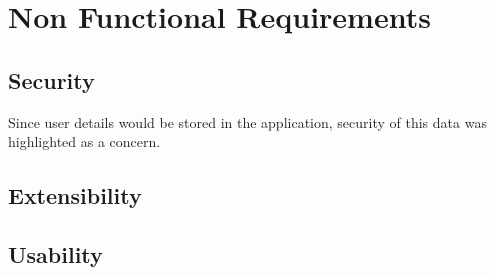 \section{Non Functional Requirements}

\subsection{Security}

Since user details would be stored in the application, security of this data was highlighted as a concern.

\subsection{Extensibility}

\subsection{Usability}
